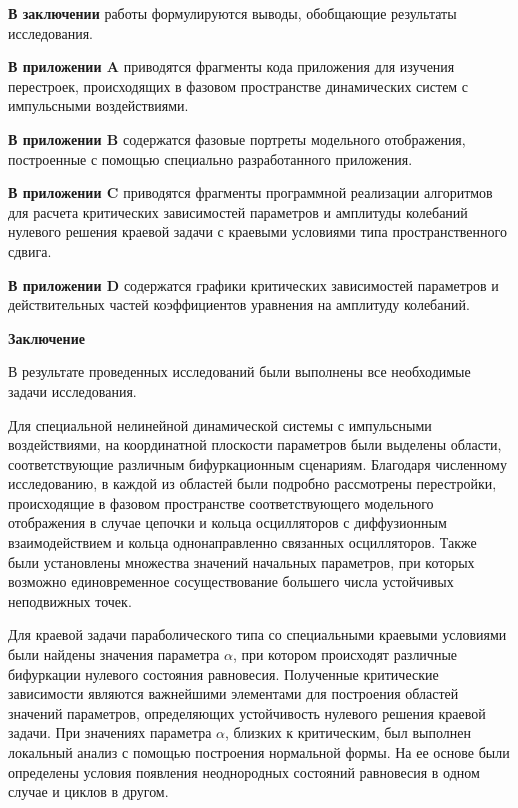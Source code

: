 \documentclass[12pt]{extarticle}
\begin{document}
\textbf{В заключении} работы формулируются выводы, обобщающие результаты исследования. 

\textbf{В приложении A} приводятся фрагменты кода приложения для изучения перестроек, происходящих в фазовом пространстве динамических систем с импульсными воздействиями.  

\textbf{В приложении B} содержатся фазовые портреты модельного отображения, построенные с помощью специально разработанного приложения.

\textbf{В приложении C} приводятся фрагменты программной реализации алгоритмов для расчета критических зависимостей параметров и амплитуды колебаний нулевого решения краевой задачи с краевыми условиями типа пространственного сдвига.

\textbf{В приложении D} содержатся графики критических зависимостей параметров и действительных частей коэффициентов уравнения на амплитуду колебаний.

\hspace{0cm}

\hspace{0cm}

\hspace{0cm}

\begin{center}
{\Large \textbf{Заключение}}
\end{center}

\hspace{0cm}

\hspace{0cm}

\hspace{0cm}

В результате проведенных исследований были выполнены все необходимые задачи исследования.

Для специальной нелинейной динамической системы с импульсными воздействиями, на координатной плоскости параметров были выделены области, соответствующие различным бифуркационным сценариям. Благодаря численному исследованию, в каждой из областей были подробно рассмотрены перестройки, происходящие в фазовом пространстве соответствующего модельного отображения в случае цепочки и кольца осцилляторов с диффузионным взаимодействием и кольца однонаправленно связанных осцилляторов. Также были установлены множества значений начальных параметров, при которых возможно единовременное сосуществование большего числа устойчивых неподвижных точек.

Для краевой задачи параболического типа со специальными краевыми условиями были найдены значения параметра $ \alpha $, при котором происходят различные бифуркации нулевого состояния равновесия. Полученные критические зависимости являются важнейшими элементами для построения областей значений параметров, определяющих устойчивость нулевого решения краевой задачи. При значениях параметра $ \alpha $, близких к критическим, был выполнен локальный анализ с помощью построения нормальной формы. На ее основе были определены условия появления неоднородных состояний равновесия в одном случае и циклов в другом.
\end{document}
